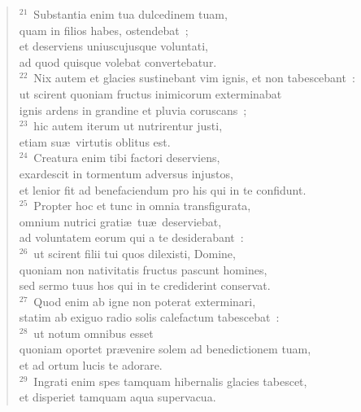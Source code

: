 \begin{verse}
${}^{21}$~Substantia enim tua dulcedinem tuam,\\ quam in filios habes, ostendebat~;\\ et deserviens uniuscujusque voluntati,\\ ad quod quisque volebat convertebatur.\\
${}^{22}$~Nix autem et glacies sustinebant vim ignis, et non tabescebant~:\\ ut scirent quoniam fructus inimicorum exterminabat\\ ignis ardens in grandine et pluvia coruscans~;\\
${}^{23}$~hic autem iterum ut nutrirentur justi,\\ etiam su\ae\ virtutis oblitus est.\\
${}^{24}$~Creatura enim tibi factori deserviens,\\ exardescit in tormentum adversus injustos,\\ et lenior fit ad benefaciendum pro his qui in te confidunt.\\
${}^{25}$~Propter hoc et tunc in omnia transfigurata,\\ omnium nutrici grati\ae\ tu\ae\ deserviebat,\\ ad voluntatem eorum qui a te desiderabant~:\\
${}^{26}$~ut scirent filii tui quos dilexisti, Domine,\\ quoniam non nativitatis fructus pascunt homines,\\ sed sermo tuus hos qui in te crediderint conservat.\\
${}^{27}$~Quod enim ab igne non poterat exterminari,\\ statim ab exiguo radio solis calefactum tabescebat~:\\
${}^{28}$~ut notum omnibus esset\\ quoniam oportet pr\ae venire solem ad benedictionem tuam,\\ et ad ortum lucis te adorare.\\
${}^{29}$~Ingrati enim spes tamquam hibernalis glacies tabescet,\\ et disperiet tamquam aqua supervacua.\end{verse}


